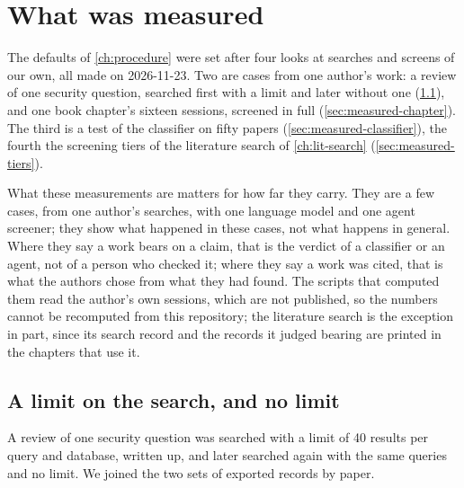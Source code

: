 \chapter{What was measured}
\label{ch:measured}


The defaults of \cref{ch:procedure} were set after four looks at
searches and screens of our own, all made on 2026-11-23.
Two are cases from one author's work: a review of one security question,
searched first with a limit and later without one
(\cref{sec:measured-limit}), and one book chapter's sixteen sessions,
screened in full (\cref{sec:measured-chapter}).
The third is a test of the classifier on fifty papers
(\cref{sec:measured-classifier}), the fourth the screening tiers of the
literature search of \cref{ch:lit-search} (\cref{sec:measured-tiers}).

What these measurements are matters for how far they carry.
They are a few cases, from one author's searches, with one language
model and one agent screener; they show what happened in these cases,
not what happens in general.
Where they say a work bears on a claim, that is the verdict of a
classifier or an agent, not of a person who checked it; where they say a
work was cited, that is what the authors chose from what they had found.
The scripts that computed them read the author's own sessions, which are
not published, so the numbers cannot be recomputed from this repository;
the literature search is the exception in part, since its search record
and the records it judged bearing are printed in the chapters that use
it.

\section{A limit on the search, and no limit}
\label{sec:measured-limit}

A review of one security question was searched with a limit of 40
results per query and database, written up, and later searched again
with the same queries and no limit.
We joined the two sets of exported records by paper.

